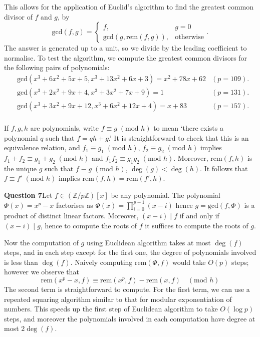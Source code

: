 \documentclass[12pt]{article}
\newcommand{\textmod}[1]{\;(\text{mod }#1)}
\newcommand{\mathmod}[1]{\quad(\text{mod }#1)}
\begin{document}
This allows for the application of Euclid's algorithm to find the greatest
common divisor of \(f\) and \(g\), by 
\[\text{gcd}(f,g) = \begin{cases} f, &g=0 \\
\text{gcd}(g,\text{rem}(f,g)),&\text{otherwise}\end{cases}.\]
The answer is generated up to a unit, so we divide by the leading coefficient to
normalise. To test the algorithm, we compute the greatest common divisors for
the following pairs of polynomials: 
\begin{align*}
    &\text{gcd}(x^3+6x^2+5x+5, x^3+13x^2+6x+3) = x^2 + 78x + 62 &(p=109). \\
    &\text{gcd}(x^3+2x^2+9x+4, x^3+3x^2+7x+9) = 1 &(p=131). \\
    &\text{gcd}(x^3+3x^2+9x+12, x^3+6x^2+12x+4) = x+83 &(p=157). \\
\end{align*}

If \(f,g,h\) are polynomials, write \(f\equiv g\textmod{h}\) to mean `there
exists a polynomial \(q\) such that \(f = qh+g\).' It is straightforward to
check that this is an equivalence relation, and \(f_1\equiv g_1\textmod{h}\),
\(f_2\equiv g_2\textmod{h}\) implies \(f_1+f_2 \equiv g_1+g_2\textmod{h}\) and
\(f_1f_2\equiv g_1g_2\textmod{h}\).  Moreover, \(\text{rem}(f,h)\) is the unique
\(g\) such that \(f\equiv g\textmod{h}\), \(\deg(g)<\deg(h)\). It follows that
\(f\equiv f'\textmod{h}\) implies \(\text{rem}(f,h)=\text{rem}(f',h)\).

\textbf{Question 7}\quad Let \(f \in (\mathbb{Z}/p\mathbb{Z})[x]\) be any polynomial. The polynomial
\(\Phi(x)=x^p-x \) factorises as \(\Phi(x) = \prod_{i=0}^{p-1}(x-i)\) hence
\(g=\text{gcd}(f,\Phi)\) is a product of distinct linear factors. Moreover,
\((x-i)\;|\;f\) if and only if \((x-i)\;|\;g\), hence to compute the roots of
\(f\) it suffices to compute the roots of \(g\).

Now the computation of \(g\) using Euclidean algorithm takes at most \(\deg(f)\)
steps, and in each step except for the first one, the degree of polynomials
involved is less than \(\deg(f)\). Naively computing \(\text{rem}(\Phi, f)\)
would take \(O(p)\) steps; however we observe that
\[\text{rem}(x^p-x,f)\equiv \text{rem}(x^p,f)-\text{rem}(x,f) \mathmod{h}\]
The second term is straightforward to compute. For the first term, we can use a
repeated squaring algorithm similar to that for modular exponentiation of
numbers. This speeds up the first step of Euclidean algorithm to take \(O(\log
p)\) steps, and moreover the polynomials involved in each computation have
degree at most \(2\deg(f)\).
\end{document}
